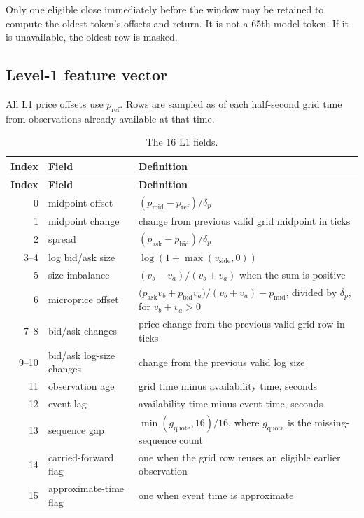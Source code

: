 \documentclass[10pt,letterpaper]{article}
\numberwithin{equation}{section}
\theoremstyle{definition}
\theoremstyle{remark}
\begin{document}
Only one eligible close immediately before the window may be retained to
compute the oldest token's offsets and return. It is not a 65th model token.
If it is unavailable, the oldest row is masked.

\subsection{Level-1 feature vector}

All L1 price offsets use $p_{\mathrm{ref}}$. Rows are sampled as of each
half-second grid time from observations already available at that time.

\begin{longtable}{@{}r p{4.2cm} p{10.0cm}@{}}
\caption{The 16 L1 fields.}\label{tab:l1-fields}\\
\toprule
\textbf{Index} & \textbf{Field} & \textbf{Definition}\\
\midrule
\endfirsthead
\toprule
\textbf{Index} & \textbf{Field} & \textbf{Definition}\\
\midrule
\endhead
0 & midpoint offset & $(p_{\mathrm{mid}}-p_{\mathrm{ref}})/\delta_p$\\
1 & midpoint change & change from previous valid grid midpoint in ticks\\
2 & spread & $(p_{\mathrm{ask}}-p_{\mathrm{bid}})/\delta_p$\\
3--4 & log bid/ask size & $\log(1+\max(v_{\mathrm{side}},0))$\\
5 & size imbalance & $(v_b-v_a)/(v_b+v_a)$ when the sum is positive\\
6 & microprice offset &
\(\bigl(p_{\mathrm{ask}}v_b+p_{\mathrm{bid}}v_a\bigr)/
(v_b+v_a)-p_{\mathrm{mid}}\), divided by \(\delta_p\), for \(v_b+v_a>0\)\\
7--8 & bid/ask changes & price change from the previous valid grid row in ticks\\
9--10 & bid/ask log-size changes & change from the previous valid log size\\
11 & observation age & grid time minus availability time, seconds\\
12 & event lag & availability time minus event time, seconds\\
13 & sequence gap & \(\min(g_{\mathrm{quote}},16)/16\), where \(g_{\mathrm{quote}}\) is the missing-sequence count\\
14 & carried-forward flag & one when the grid row reuses an eligible earlier observation\\
15 & approximate-time flag & one when event time is approximate\\
\bottomrule
\end{longtable}
\end{document}
